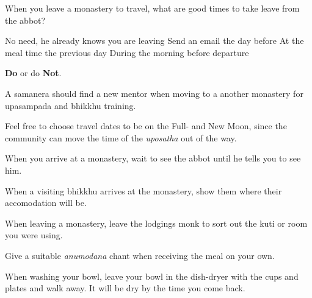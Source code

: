 \begin{exam}{\autoExamName}
\problemDivide

\begin{problem}

  When you leave a monastery to travel, what are good times to take leave from
  the abbot?

  \bigskip

  \begin{answers}{1}
    \bChoices
     No need, he already knows you are leaving\eAns
     Send an email the day before\eAns
     At the meal time the previous day\eAns
     During the morning before departure\eAns
    \eChoices
  \end{answers}

\end{problem}

\problemDivide

\begin{problem*}

  \textbf{Do} or do \textbf{Not}.

  \bigskip

  \begin{parts}

  \item {} A samanera should find a new mentor when moving to a another
    monastery for upasampada and bhikkhu training.

  \item {} Feel free to choose travel dates to be on the Full- and New Moon,
    since the community can move the time of the \textit{uposatha} out of the way.

  \item {} When you arrive at a monastery, wait to see the abbot until he
    tells you to see him.

  \item {} When a visiting bhikkhu arrives at the monastery, show them where
    their accomodation will be.

  \item {} When leaving a monastery, leave the lodgings monk to sort out the
    kuti or room you were using.

  \item {} Give a suitable \textit{anumodana} chant when receiving the meal
    on your own.

  \item {} When washing your bowl, leave your bowl in the dish-dryer with
    the cups and plates and walk away. It will be dry by the time you come back.


\end{parts}
\end{problem*}
\end{exam}
